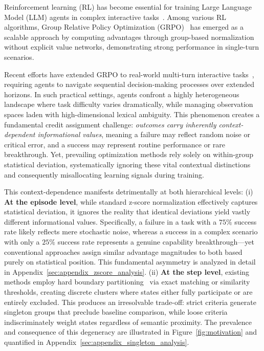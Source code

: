\documentclass[11pt]{article}
\begin{document}
Reinforcement learning (RL) has become essential for training Large Language Model (LLM) agents in complex interactive tasks~\cite{schulman2017proximal,christiano2017deep}. Among various RL algorithms, Group Relative Policy Optimization (GRPO)~\cite{shao2024deepseekmath} has emerged as a scalable approach by computing advantages through group-based normalization without explicit value networks, demonstrating strong performance in single-turn scenarios.

Recent efforts have extended GRPO to real-world multi-turn interactive tasks~\cite{shridhar2020alfworld,yao2022webshop}, requiring agents to navigate sequential decision-making processes over extended horizons. In such practical settings, agents confront a highly heterogeneous landscape where task difficulty varies dramatically, while managing observation spaces laden with high-dimensional lexical ambiguity. This phenomenon creates a fundamental credit assignment challenge: \textit{outcomes carry inherently context-dependent informational values}, meaning a failure may reflect random noise or critical error, and a success may represent routine performance or rare breakthrough. Yet, prevailing optimization methods rely solely on within-group statistical deviation, systematically ignoring these vital contextual distinctions and consequently misallocating learning signals during training.

This context-dependence manifests detrimentally at both hierarchical levels: (i) \textbf{At the episode level}, while standard z-score normalization effectively captures statistical deviation, it ignores the reality that identical deviations yield vastly different informational values. Specifically, a failure in a task with a $75\%$ success rate likely reflects mere stochastic noise, whereas a success in a complex scenario with only a $25\%$ success rate represents a genuine capability breakthrough—yet conventional approaches assign similar advantage magnitudes to both based purely on statistical position. This fundamental asymmetry is analyzed in detail in Appendix~\ref{sec:appendix_zscore_analysis}. (ii) \textbf{At the step level}, existing methods employ hard boundary partitioning~\cite{feng2025group} via exact matching or similarity thresholds, creating discrete clusters where states either fully participate or are entirely excluded. This produces an irresolvable trade-off: strict criteria generate singleton groups that preclude baseline comparison, while loose criteria indiscriminately weight states regardless of semantic proximity. The prevalence and consequence of this degeneracy are illustrated in Figure~\ref{fig:motivation} and quantified in Appendix~\ref{sec:appendix_singleton_analysis}.
\end{document}
